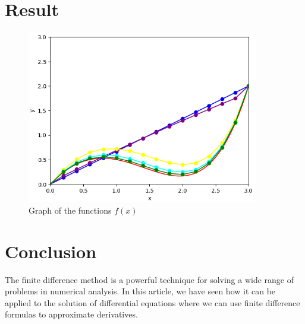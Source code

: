 \documentclass{article}
\begin{document}
\section*{Result}
\begin{figure}[H]
    \centering
    \includegraphics[width=0.9\textwidth]{graph.png}
    \caption{Graph of the functions $f(x)$}
    \label{fig:example}
\end{figure}
\section*{Conclusion}

The finite difference method is a powerful technique for solving a wide range of problems in numerical analysis. In this article, we have seen how it can be applied to the solution of differential equations where we can use finite difference formulas to approximate derivatives.
\end{document}
